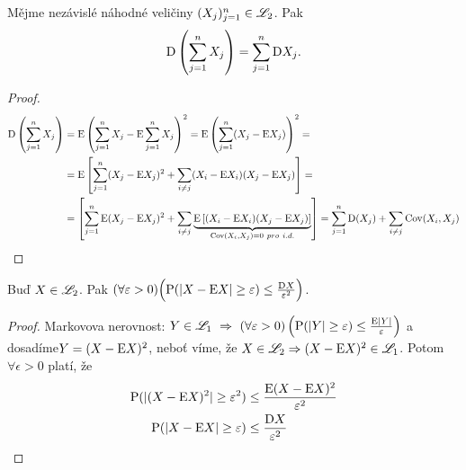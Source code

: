 \begin{theorem}\label{Decko}
	Mějme nezávislé náhodné veličiny $(X_j)_{j=1}^n\in\mathscr{L}_2$. Pak \[
	\mathrm{D} \left( \sum\limits_{j=1}^n X_j \right)=\sum\limits_{j=1}^n \mathrm{D} X_j.
	\] 
	\begin{proof}
		\[
		\begin{split}
		 \mathrm{D} \left( \sum\limits_{j=1}^n X_j \right)&=\mathrm{E}  \left( \sum\limits_{j=1}^n X_j - \mathrm{E} \sum\limits_{j=1}^n X_j \right)^2=\mathrm{E} \left( \sum\limits_{j=1}^n (X_j-\mathrm{E} X_j) \right)^2=\\ &=\mathrm{E} \left[ \sum\limits_{j=1}^n (X_j-\mathrm{E} X_j)^2 + \sum\limits_{i\neq j}(X_i-\mathrm{E} X_i)(X_j-\mathrm{E} X_j) \right]=\\ &=\left[ \sum\limits_{j=1}^n \mathrm{E} (X_j-\mathrm{E} X_j)^2 + \sum\limits_{i\neq j}\underbrace{\mathrm{E} \left[(X_i-\mathrm{E} X_i)(X_j-\mathrm{E} X_j)\right]}_{\mathop{\mathrm{Cov}}(X_i,X_j)=0~pro~i.d.} \right]=\sum\limits_{j=1}^n \mathrm{D} (X_j)+\sum\limits_{i\neq j}\mathop{\mathrm{Cov}}(X_i,X_j) 
		\end{split}
		\]
	\end{proof}
\end{theorem}
\begin{theorem}
	Buď $X\in\mathscr{L}_2$. Pak $(\forall \varepsilon>0)\Bigl(\mathrm{P}(|X-\mathrm{E} X|\geq \varepsilon)\leq \frac{\mathrm{D} X}{\varepsilon^2}\Bigr)$.
	\begin{proof}
		Markovova nerovnost: $ Y\in\mathscr{L}_1~\Rightarrow~(\forall\varepsilon>0)\left(\mathrm{P}(|Y|\geq \varepsilon)\leq \frac{\mathrm{E} |Y|}{\varepsilon}\right) $ a dosadíme\newline $Y=(X-\mathrm{E} X)^2$, neboť víme, že $X \in \mathscr{L}_2  \Rightarrow (X-\mathrm{E} X)^2\in \mathscr{L}_1$. Potom $\forall \epsilon>0$ platí, že
		\[
		\begin{split}
		\mathrm{P}(|(X-\mathrm{E} X)^2|\geq \varepsilon^2)&\leq \frac{\mathrm{E} (X-\mathrm{E} X)^2}{\varepsilon^2} \\ \mathrm{P}(|X-\mathrm{E} X|\geq \varepsilon)&\leq \frac{\mathrm{D} X}{\varepsilon^2} 
		\end{split}
		\] 
	\end{proof}
\end{theorem}

